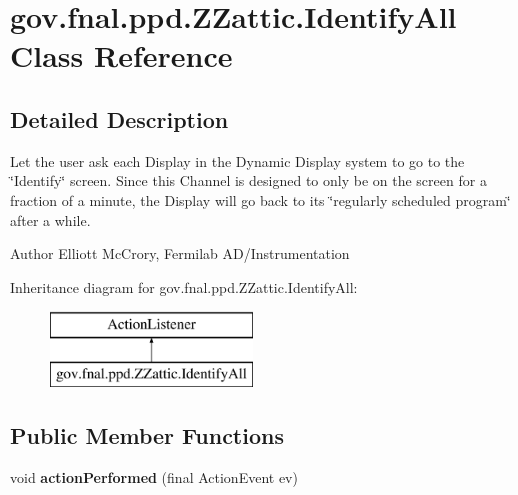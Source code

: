 \hypertarget{classgov_1_1fnal_1_1ppd_1_1ZZattic_1_1IdentifyAll}{\section{gov.\-fnal.\-ppd.\-Z\-Zattic.\-Identify\-All Class Reference}
\label{classgov_1_1fnal_1_1ppd_1_1ZZattic_1_1IdentifyAll}
}


\subsection{Detailed Description}
Let the user ask each Display in the Dynamic Display system to go to the \char`\"{}\-Identify\char`\"{} screen. Since this Channel is designed to only be on the screen for a fraction of a minute, the Display will go back to its \char`\"{}regularly scheduled program\char`\"{} after a while.

\begin{DoxyAuthor}{Author}
Elliott Mc\-Crory, Fermilab A\-D/\-Instrumentation 
\end{DoxyAuthor}
Inheritance diagram for gov.\-fnal.\-ppd.\-Z\-Zattic.\-Identify\-All\-:\begin{figure}[H]
\begin{center}
\leavevmode
\includegraphics[height=2.000000cm]{classgov_1_1fnal_1_1ppd_1_1ZZattic_1_1IdentifyAll}
\end{center}
\end{figure}
\subsection*{Public Member Functions}
\begin{DoxyCompactItemize}
\item 
\hypertarget{classgov_1_1fnal_1_1ppd_1_1ZZattic_1_1IdentifyAll_aad393999a0545d86f0cb86ad2c8e3393}{void {\bfseries action\-Performed} (final Action\-Event ev)}\label{classgov_1_1fnal_1_1ppd_1_1ZZattic_1_1IdentifyAll_aad393999a0545d86f0cb86ad2c8e3393}

\end{DoxyCompactItemize}
